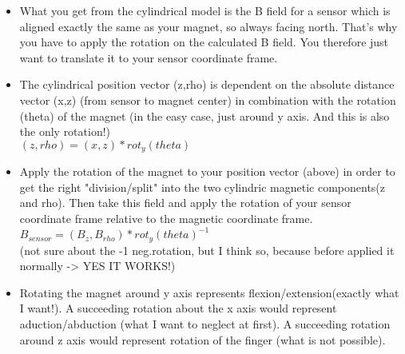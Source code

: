 \begin{itemize}
\item What you get from the cylindrical model is the B field for a sensor which is aligned exactly the same as your magnet, so always facing north. That's why you have to apply the rotation on the calculated B field. You therefore just want to translate it to your sensor coordinate frame.

\item The cylindrical position vector (z,rho) is dependent on the absolute distance vector (x,z) (from sensor to magnet center) in combination with the rotation (theta) of the magnet (in the easy case, just around y axis. And this is also the only rotation!)\\
$ (z,rho) = (x,z)*rot_{y}(theta) $

\item Apply the rotation of the magnet to your position vector (above) in order to get the right "division/split" into the two cylindric magnetic components(z and rho). Then take this field and apply the rotation of your sensor coordinate frame relative to the magnetic coordinate frame.\\
$ B_{sensor} = (B_{z},B_{rho})*rot_{y}(theta)^{-1} $\\
(not sure about the -1 neg.rotation, but I think so, because before applied it normally -> YES IT WORKS!)

\item Rotating the magnet around y axis represents flexion/extension(exactly what I want!).
A succeeding rotation about the x axis would represent aduction/abduction (what I want to neglect at first).
A succeeding rotation around z axis would represent rotation of the finger (what is not possible).
\end{itemize}
